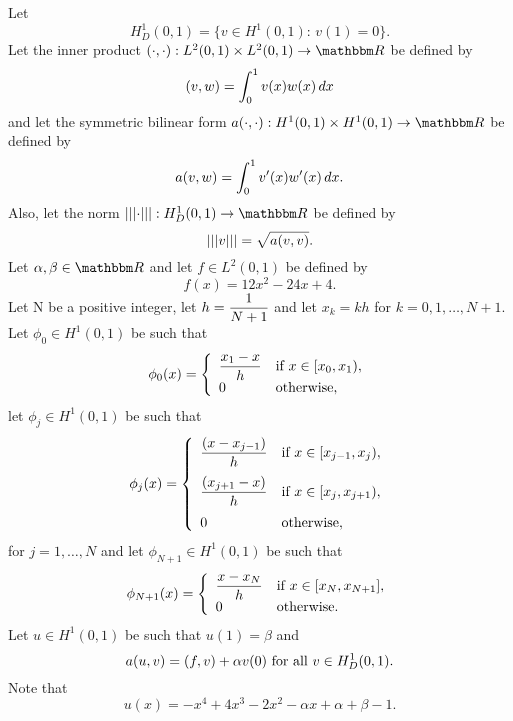 
Let
\[
H^1_D(0,1)=\{v\in H^1(0,1):\,v(1)=0\}.
\]
Let the inner product $\ip{\cdot,\cdot}:L^2(0,1)\times L^2(0,1)\to\R$ be defined by
\[
(v,w)=\int_0^1v(x)w(x)\,dx
\]
and let the symmetric bilinear form $a\ip{\cdot,\cdot}:H^1(0,1)\times H^1(0,1)\to\R$ be defined by
\[
a(v,w)=\int_0^1v'(x)w'(x)\,dx.
\]
Also, let the norm $\left|\left|\left|\cdot\right|\right|\right|:H^1_D(0,1)\to\R$ be defined by
\[
\left|\left|\left|v\right|\right|\right|=\sqrt{a(v,v)}.
\]
Let $\alpha,\beta\in\R$ and let $f\in L^2(0,1)$ be defined by
\[
f(x)=12x^2-24x+4.
\]
Let N be a positive integer, let $\displaystyle{h={1 \over N+1}}$ and let $x_k=kh$ for $k=0,1,\ldots,N+1$. Let $\phi_0\in H^1(0,1)$ be such that
\[
\phi_0(x) = \left\{\begin{array}{ll}
\displaystyle{x_1-x \over h} & \mbox{if }x\in[x_0,x_1),\\
0& \mbox{otherwise},
\end{array}\right.
\]
let $\phi_j\in H^1(0,1)$ be such that
\[
\phi_j(x) = \left\{\begin{array}{ll}
\displaystyle{{(x-x_{j-1}) \over h}} & \displaystyle{\mbox{if }x\in[x_{j-1},x_j)},
\\[10pt]
\displaystyle{{(x_{j+1}-x) \over h}} & \displaystyle{\mbox{if }x\in[x_j,x_{j+1})},
\\[10pt]
0 & \mbox{otherwise},
\end{array}\right.
\]
for $j=1,\ldots,N$ and let $\phi_{N+1}\in H^1(0,1)$ be such that
\[
\phi_{N+1}(x) = \left\{\begin{array}{ll}
\displaystyle{x-x_N \over h} & \mbox{if }x\in[x_N,x_{N+1}],\\
0& \mbox{otherwise.}
\end{array}\right.
\]
 Let $u\in H^1(0,1)$ be such that $u(1)=\beta$ and
\[
a(u,v)=(f,v)+\alpha v(0)\mbox{ for all }v\in H^1_D(0,1).
\]
Note that
\[
u(x)=-x^4+4x^3-2x^2-\alpha x+\alpha+\beta-1.
\]
\\

